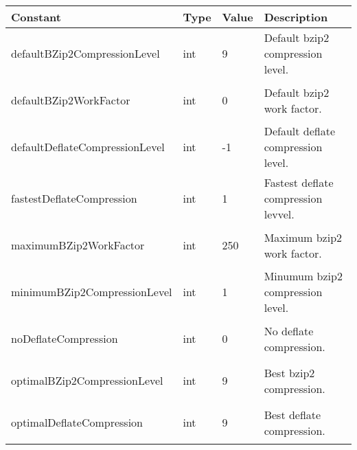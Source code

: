 \documentclass[a4paper,oneside,11.000000pt]{book}
\begin{document}
\begin{flushleft}
\begin{supertabular}[l]{!{\raggedright}p{3.6125cm}!{\raggedright}p{1.17735cm}!{\raggedright}p{1.32877cm}!{\raggedright}p{5.89623cm}}
\textbf{Constant}
& \textbf{Type}
& \textbf{Value}
& \textbf{Description}
\\
\hline
\hypertarget{System.IO.Compression.defaultBZip2CompressionLevel}{defaultBZip2CompressionLevel}
& int
& 9
& Default bzip2 compression level.

\\
\hypertarget{System.IO.Compression.defaultBZip2WorkFactor}{defaultBZip2WorkFactor}
& int
& 0
& Default bzip2 work factor.

\\
\hypertarget{System.IO.Compression.defaultDeflateCompressionLevel}{defaultDeflateCompressionLevel}
& int
& -1
& Default deflate compression level.

\\
\hypertarget{System.IO.Compression.fastestDeflateCompression}{fastestDeflateCompression}
& int
& 1
& Fastest deflate compression levvel.

\\
\hypertarget{System.IO.Compression.maximumBZip2WorkFactor}{maximumBZip2WorkFactor}
& int
& 250
& Maximum bzip2 work factor.

\\
\hypertarget{System.IO.Compression.minimumBZip2CompressionLevel}{minimumBZip2CompressionLevel}
& int
& 1
& Minumum bzip2 compression level.

\\
\hypertarget{System.IO.Compression.noDeflateCompression}{noDeflateCompression}
& int
& 0
& No deflate compression.

\\
\hypertarget{System.IO.Compression.optimalBZip2CompressionLevel}{optimalBZip2CompressionLevel}
& int
& 9
& Best bzip2 compression.

\\
\hypertarget{System.IO.Compression.optimalDeflateCompression}{optimalDeflateCompression}
& int
& 9
& Best deflate compression.

\\
\end{supertabular}

\end{flushleft}
\clearpage
\end{document}
